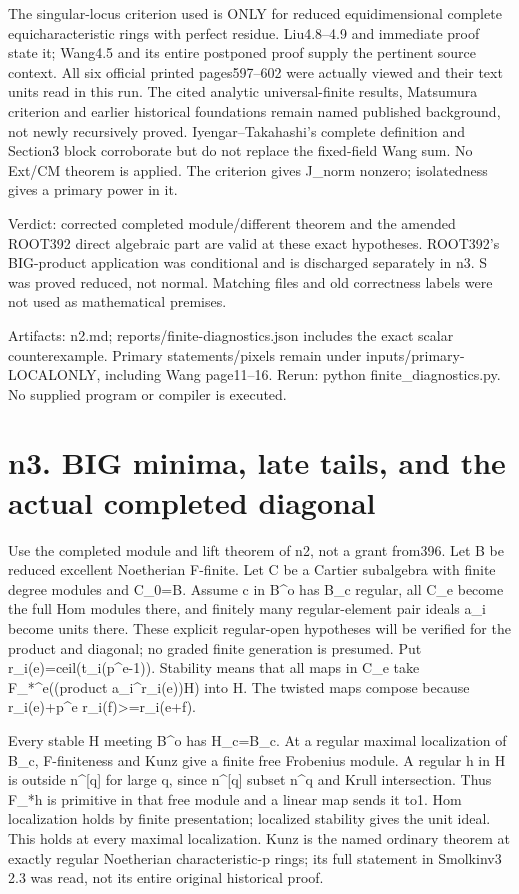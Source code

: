 \documentclass[11pt]{article}
\begin{document}
The singular-locus criterion used is ONLY for reduced equidimensional complete equicharacteristic rings with perfect residue. Liu4.8--4.9 and immediate proof state it; Wang4.5 and its entire postponed proof supply the pertinent source context. All six official printed pages597--602 were actually viewed and their text units read in this run. The cited analytic universal-finite results, Matsumura criterion and earlier historical foundations remain named published background, not newly recursively proved. Iyengar--Takahashi's complete definition and Section3 block corroborate but do not replace the fixed-field Wang sum. No Ext/CM theorem is applied. The criterion gives J\_norm nonzero; isolatedness gives a primary power in it.

Verdict: corrected completed module/different theorem and the amended ROOT392 direct algebraic part are valid at these exact hypotheses. ROOT392's BIG-product application was conditional and is discharged separately in n3. S was proved reduced, not normal. Matching files and old correctness labels were not used as mathematical premises.

Artifacts: n2.md; reports/finite-diagnostics.json includes the exact scalar counterexample. Primary statements/pixels remain under inputs/primary-LOCALONLY, including Wang page11--16. Rerun: python finite\_diagnostics.py. No supplied program or compiler is executed.

\section{n3. BIG minima, late tails, and the actual completed diagonal}

Use the completed module and lift theorem of n2, not a grant from396. Let B be reduced excellent Noetherian F-finite. Let C be a Cartier subalgebra with finite degree modules and C\_0=B. Assume c in B\textasciicircum{}o has B\_c regular, all C\_e become the full Hom modules there, and finitely many regular-element pair ideals a\_i become units there. These explicit regular-open hypotheses will be verified for the product and diagonal; no graded finite generation is presumed. Put r\_i(e)=ceil(t\_i(p\textasciicircum{}e-1)). Stability means that all maps in C\_e take F\_*\textasciicircum{}e((product a\_i\textasciicircum{}r\_i(e))H) into H. The twisted maps compose because r\_i(e)+p\textasciicircum{}e r\_i(f)>=r\_i(e+f).

Every stable H meeting B\textasciicircum{}o has H\_c=B\_c. At a regular maximal localization of B\_c, F-finiteness and Kunz give a finite free Frobenius module. A regular h in H is outside n\textasciicircum{}[q] for large q, since n\textasciicircum{}[q] subset n\textasciicircum{}q and Krull intersection. Thus F\_*h is primitive in that free module and a linear map sends it to1. Hom localization holds by finite presentation; localized stability gives the unit ideal. This holds at every maximal localization. Kunz is the named ordinary theorem at exactly regular Noetherian characteristic-p rings; its full statement in Smolkinv3 2.3 was read, not its entire original historical proof.
\end{document}
